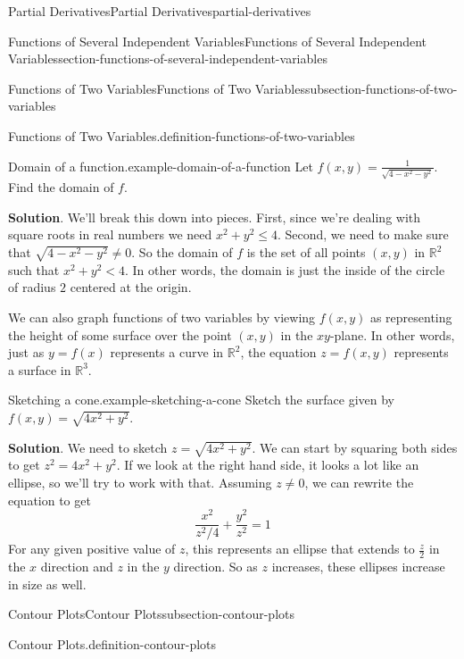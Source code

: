 \documentclass[oneside,10pt,]{book}
\numberwithin{equation}{section}
\newcommand{\RR}{\mathbb{R}}
\begin{document}
\begin{chapterptx}{Partial Derivatives}{}{Partial Derivatives}{}{}{partial-derivatives}
\begin{sectionptx}{Functions of Several Independent Variables}{}{Functions of Several Independent Variables}{}{}{section-functions-of-several-independent-variables}
\begin{subsectionptx}{Functions of Two Variables}{}{Functions of Two Variables}{}{}{subsection-functions-of-two-variables}
\begin{definition}{Functions of Two Variables.}{definition-functions-of-two-variables}
\end{definition}
\begin{example}{Domain of a function.}{example-domain-of-a-function}%
\hypertarget{p-1331}{}%
Let \(f(x,y) = \frac{1}{\sqrt{4 - x^{2} - y^{2}}}\). Find the domain of \(f\).%
\par\smallskip%
\noindent\textbf{Solution}.\hypertarget{solution-211}{}\quad%
\hypertarget{p-1332}{}%
We'll break this down into pieces. First, since we're dealing with square roots in real numbers we need \(x^{2}+y^{2}\leq4\). Second, we need to make sure that \(\sqrt{4 - x^{2} - y^{2}}\neq0\). So the domain of \(f\) is the set of all points \((x,y)\) in \(\RR^{2}\) such that \(x^{2} + y^{2} < 4\). In other words, the domain is just the inside of the circle of radius \(2\) centered at the origin.%
\end{example}
\hypertarget{p-1333}{}%
We can also graph functions of two variables by viewing \(f(x,y)\) as representing the height of some surface over the point \((x,y)\) in the \(xy\)-plane. In other words, just as \(y = f(x)\) represents a curve in \(\RR^{2}\), the equation \(z = f(x,y)\) represents a surface in \(\RR^{3}\).%
\begin{example}{Sketching a cone.}{example-sketching-a-cone}%
\hypertarget{p-1334}{}%
Sketch the surface given by \(f(x,y) = \sqrt{4x^{2} + y^{2}}\).%
\par\smallskip%
\noindent\textbf{Solution}.\hypertarget{solution-212}{}\quad%
\hypertarget{p-1335}{}%
We need to sketch \(z = \sqrt{4x^{2} + y^{2}}\). We can start by squaring both sides to get \(z^{2} = 4x^{2} + y^{2}\). If we look at the right hand side, it looks a lot like an ellipse, so we'll try to work with that. Assuming \(z\neq0\), we can rewrite the equation to get%
\begin{equation*}
\frac{x^{2}}{z^{2}/4} + \frac{y^{2}}{z^{2}} = 1
\end{equation*}
For any given positive value of \(z\), this represents an ellipse that extends to \(\frac{z}{2}\) in the \(x\) direction and \(z\) in the \(y\) direction. So as \(z\) increases, these ellipses increase in size as well.%
\end{example}
\end{subsectionptx}
%
%
\typeout{************************************************}
\typeout{************************************************}
%
\begin{subsectionptx}{Contour Plots}{}{Contour Plots}{}{}{subsection-contour-plots}
\begin{definition}{Contour Plots.}{definition-contour-plots}%

\end{definition}
\end{subsectionptx}
\end{sectionptx}
\end{chapterptx}
\end{document}
